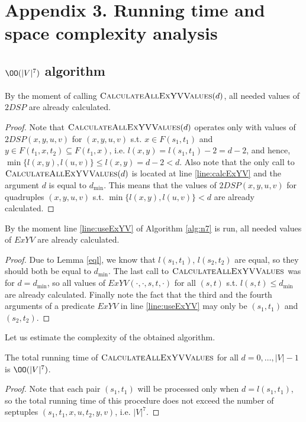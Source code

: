\section{Appendix 3. Running time and space complexity analysis}

\subsection{$\OO(|V|^7)$ algorithm}

\begin{proposition} \label{n7_corr1}
By the moment of calling $\textsc{CalculateAllExYVValues}(d)$, all needed values of $2DSP$ are already calculated.
\end{proposition}
\begin{proof}
Note that $\textsc{CalculateAllExYVValues}(d)$ operates only with values of $2DSP(x, y, u, v)$ for $(x, y, u, v)$ s.t. $x \in F(s_1, t_1)$ and $y \in F(t_1,x,t_2) \subseteq F(t_1, x)$, i.e. $l(x, y) = l(s_1, t_1) - 2 = d - 2$, and hence, $\min\{l(x, y), l(u, v)\} \leq l(x, y) = d - 2 < d$. Also note that the only call to $\textsc{CalculateAllExYVValues}(d)$ is located at line \ref{line:calcExYV} and the argument $d$ is equal to $d_{\min}$. This means that the values of $2DSP(x, y, u, v)$ for quadruples $(x, y, u, v)$ s.t. $\min\{l(x, y), l(u, v)\} < d$ are already calculated. 
\end{proof}

\begin{proposition} \label{n7_corr2}
By the moment line \ref{line:useExYV} of Algorithm \ref{alg:n7} is run, all needed values of $ExYV$ are already calculated.
\end{proposition}
\begin{proof}
Due to Lemma \ref{eql}, we know that $l(s_1, t_1)$, $l(s_2, t_2)$ are equal, so they should both be equal to $d_{\min}$. The last call to $\textsc{CalculateAllExYVValues}$ was for $d = d_{\min}$, so all values of $ExYV(\cdot, \cdot, s, t, \cdot)$ for all $(s, t)$ s.t. $l(s, t) \leq d_{\min}$ are already calculated. Finally note the fact that the third and the fourth arguments of a predicate $ExYV$ in line \ref{line:useExYV} may only be $(s_1, t_1)$ and $(s_2, t_2)$.
\end{proof}

Let us estimate the complexity of the obtained algorithm.

\begin{proposition} \label{n7_rt1}
The total running time of $\textsc{CalculateAllExYVValues}$ for all $d = 0, \ldots, |V|-1$ is $\OO(|V|^7)$. 
\end{proposition}
\begin{proof}
Note that each pair $(s_1, t_1)$ will be processed only when $d = l(s_1, t_1)$, so the total running time of this procedure does not exceed the number of septuples $(s_1, t_1, x, u, t_2, y, v)$, i.e. $|V|^7$.
\end{proof}

